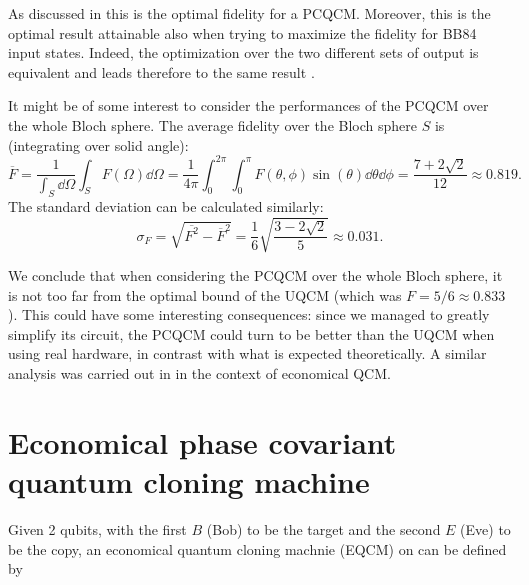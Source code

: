 As discussed in \cite{PhaseCovariantOptimalBruss} this is the optimal fidelity for a PCQCM. 
Moreover, this is the optimal result attainable also when trying to maximize the fidelity for BB84 input states.
Indeed, the optimization over the two different sets of output is equivalent and leads therefore to the same result \cite{PhaseCovariantOptimalBruss}.

It might be of some interest to consider the performances of the PCQCM over the whole Bloch sphere.
The average fidelity over the Bloch sphere $S$ is (integrating over solid angle):
\[
    \overline{F}=\frac{1}{\int_S \dd{\Omega}}\int_S F(\Omega)\dd{\Omega}=\frac{1}{4\pi}\int_0^{2\pi}\int_0^\pi F(\theta,\phi)\sin(\theta)\dd{\theta}\dd{\phi}=\frac{7+2\sqrt{2}}{12}\approx 0.819.
\]
The standard deviation can be calculated similarly:
\[
    \sigma_{F}=\sqrt{\overline{F^2}-\overline{F}^2}=\frac{1}{6}\sqrt{\frac{3-2\sqrt{2}}{5}}\approx0.031.
\]

We conclude that when considering the PCQCM over the whole Bloch sphere, it is not too far from the optimal bound of the UQCM (which was $F=5/6\approx 0.833$).
This could have some interesting consequences: since we managed to greatly simplify its circuit, the PCQCM could turn to be better than the UQCM when using real hardware, in contrast with what is expected theoretically.
A similar analysis was carried out in \cite{LowCostCloning} in the context of economical QCM.
\section{Economical phase covariant quantum cloning machine}

Given 2 qubits, with the first $B$ (Bob) to be the target and the second $E$ (Eve) to be the copy, an economical quantum cloning machnie 
(EQCM) on can be defined by \cite{EconomicalNiuGriffiths} 

